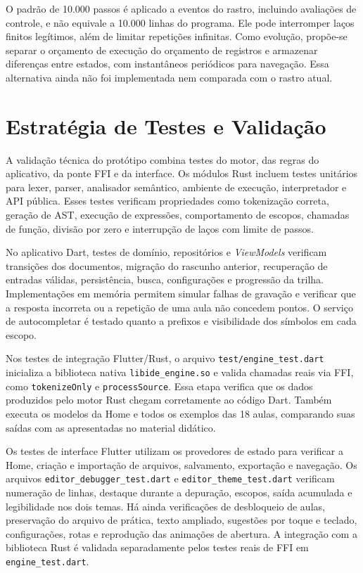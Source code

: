 \documentclass[
    12pt
    ,oneside
    ,a4paper
    ,chapter=TITLE
    ,section=TITLE
    ,sumario=abnt-6027-2012]{abntex2}
\begin{document}
O padrão de 10.000 passos é aplicado a eventos do rastro, incluindo avaliações
de controle, e não equivale a 10.000 linhas do programa. Ele pode interromper
laços finitos legítimos, além de limitar repetições infinitas.  Como evolução, propõe-se
separar o orçamento de execução do orçamento de registros e armazenar diferenças
entre estados, com instantâneos periódicos para navegação. Essa alternativa ainda
não foi implementada nem comparada com o rastro atual.

\section{Estratégia de Testes e Validação}

A validação técnica do protótipo combina testes do motor, das regras do aplicativo, da ponte
FFI e da interface. Os módulos Rust incluem testes unitários para lexer, parser, analisador
semântico, ambiente de execução, interpretador e API pública. Esses testes verificam
propriedades como tokenização correta, geração de AST, execução de expressões, comportamento
de escopos, chamadas de função, divisão por zero e interrupção de laços com limite de passos.

No aplicativo Dart, testes de domínio, repositórios e \textit{ViewModels} verificam
transições dos documentos, migração do rascunho anterior, recuperação de entradas válidas,
persistência, busca, configurações e progressão da trilha. Implementações em memória permitem
simular falhas de gravação e verificar que a resposta incorreta ou a repetição de uma aula
não concedem pontos. O serviço de autocompletar é testado quanto a prefixos e visibilidade
dos símbolos em cada escopo.

Nos testes de integração Flutter/Rust, o arquivo \texttt{test/engine\_test.dart} inicializa
a biblioteca nativa \texttt{libide\_engine.so} e valida chamadas reais via FFI, como
\texttt{tokenizeOnly} e \texttt{processSource}. Essa etapa verifica que os dados produzidos
pelo motor Rust chegam corretamente ao código Dart. Também executa os modelos da Home e
todos os exemplos das 18 aulas, comparando suas saídas com as apresentadas no material didático.

Os testes de interface Flutter utilizam os provedores de estado para verificar a Home,
criação e importação de arquivos, salvamento, exportação e navegação. Os arquivos
\texttt{editor\_debugger\_test.dart} e \texttt{editor\_theme\_test.dart} verificam numeração
de linhas, destaque durante a depuração, escopos, saída acumulada e legibilidade nos dois
temas. Há ainda verificações de desbloqueio de aulas, preservação do arquivo de prática,
texto ampliado, sugestões por toque e teclado, configurações, rotas e reprodução das
animações de abertura. A integração com a biblioteca Rust é validada separadamente pelos
testes reais de FFI em \texttt{engine\_test.dart}.
\end{document}

